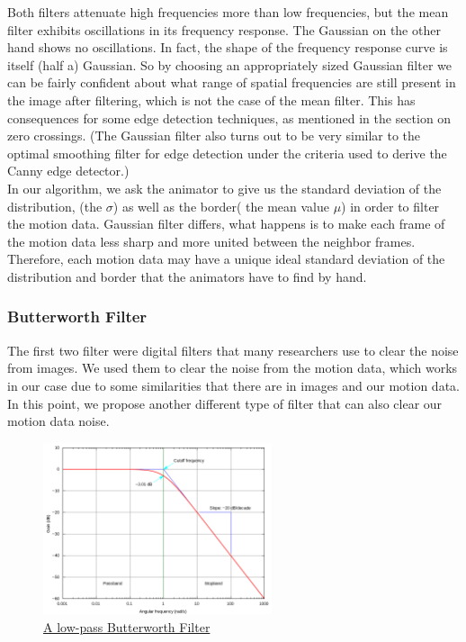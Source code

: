 Both filters attenuate high frequencies more than low frequencies, but the mean filter exhibits oscillations in its frequency response. The Gaussian on the other hand shows no oscillations. In fact, the shape of the frequency response curve is itself (half a) Gaussian. So by choosing an appropriately sized Gaussian filter we can be fairly confident about what range of spatial frequencies are still present in the image after filtering, which is not the case of the mean filter. This has consequences for some edge detection techniques, as mentioned in the section on zero crossings. (The Gaussian filter also turns out to be very similar to the optimal smoothing filter for edge detection under the criteria used to derive the Canny edge detector.)\\

In our algorithm, we ask the animator to give us the standard deviation of the distribution, (the $\sigma$) as well as the border( the mean value $\mu$) in order to filter the motion data. Gaussian filter differs, what happens is to make each frame of the motion data less sharp and more united between the neighbor frames. Therefore, each motion data may have a unique ideal standard deviation of the distribution and border that the animators have to find by hand.

 
\subsubsection*{Butterworth Filter}
The first two filter were digital filters that many researchers use to clear the noise from images. We used them to clear the noise from the motion data, which works in our case due to some similarities that there are in images and our motion data. In this point, we propose another different type of filter that can also clear our motion data noise. \\

\begin{figure}[h]
	\centering
	\includegraphics[width=0.6\textwidth]{figures/Implementation/butterworthfilter.png}
	\captionsetup{labelformat=empty}
	\caption{\href{https://upload.wikimedia.org/wikipedia/commons/thumb/6/60/Butterworth_response.svg/2560px-Butterworth_response.svg.png}
	{A low-pass Butterworth Filter}}
\end{figure}

